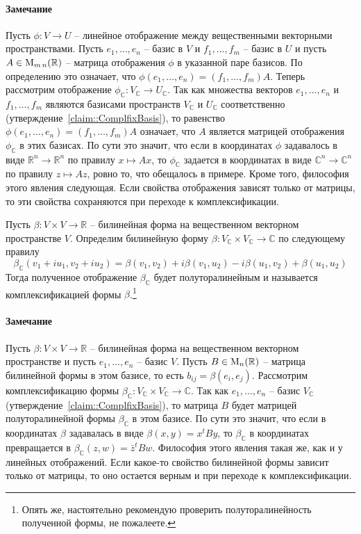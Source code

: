 \paragraph{Замечание}
Пусть $\phi\colon V\to U$ -- линейное  отображение между вещественными векторными пространствами. Пусть $e_1,\ldots,e_n$ -- базис в $V$ и $f_1,\ldots,f_m$ -- базис в $U$ и пусть $A\in \operatorname{M}_{m\,n}(\mathbb R)$ -- матрица отображения $\phi$ в указанной паре базисов. По определению это означает, что $\phi(e_1,\ldots,e_n) = (f_1,\ldots,f_m)A$. Теперь рассмотрим отображение $\phi_\mathbb C \colon V_\mathbb C\to U_\mathbb C$. Так как множества векторов $e_1,\ldots,e_n$ и $f_1,\ldots,f_m$ являются базисами пространств $V_\mathbb C$ и $U_\mathbb C$ соответственно (утверждение~\ref{claim::ComplfixBasis}), то равенство $\phi(e_1,\ldots,e_n) = (f_1,\ldots,f_m)A$ означает, что $A$ является матрицей отображения $\phi_\mathbb C$ в этих базисах. По сути это значит, что если в координатах $\phi$ задавалось в виде $\mathbb R^n \to \mathbb R^n$ по правилу $x \mapsto Ax$, то $\phi_\mathbb C$ задается в координатах в виде $\mathbb C^n \to \mathbb C^n$ по правилу $z\mapsto Az$, ровно то, что обещалось в примере. Кроме того, философия этого явления следующая. Если свойства отображения зависят только от матрицы, то эти свойства сохраняются при переходе к комплексификации.


\begin{definition}\label{definition::ComplfixBil}
Пусть $\beta\colon V\times V\to \mathbb R$ -- билинейная форма на вещественном векторном пространстве $V$. Определим билинейную форму $\beta \colon V_\mathbb C\times V_\mathbb C\to \mathbb C$ по следующему правилу
\[
\beta_\mathbb C(v_1+iu_1, v_2 + iu_2) = \beta(v_1, v_2) + i\beta(v_1,u_2) - i\beta(u_1, v_2) + \beta(u_1, u_2)
\]
Тогда полученное отображение $\beta_\mathbb C$ будет полуторалинейным и называется комплексификацией формы $\beta$.\footnote{Опять же, настоятельно рекомендую проверить полуторалинейность полученной формы, не пожалеете.}
\end{definition}

\paragraph{Замечание}
Пусть $\beta\colon V\times V\to \mathbb R$ -- билинейная форма на вещественном векторном пространстве и пусть $e_1,\ldots,e_n$ -- базис $V$. Пусть $B\in \operatorname{M}_{n}(\mathbb R)$ -- матрица билинейной формы в этом базисе, то есть $b_{ij} = \beta(e_i,e_j)$. Рассмотрим комплексификацию формы $\beta_\mathbb C \colon V_\mathbb C\times V_\mathbb C\to \mathbb C$. Так как $e_1,\ldots,e_n$ -- базис $V_\mathbb C$ (утверждение~\ref{claim::ComplfixBasis}), то матрица $B$ будет матрицей полуторалинейной формы $\beta_\mathbb C$ в этом базисе. По сути это значит, что если в координатах $\beta$ задавалась в виде $\beta(x, y) = x^t B y$, то $\beta_\mathbb C$ в координатах превращается в $\beta_\mathbb C(z, w) = \bar z^t B w$. Философия этого явления такая же, как и у линейных отображений. Если какое-то свойство билинейной формы зависит только от матрицы, то оно остается верным и при переходе к комплексификации.



